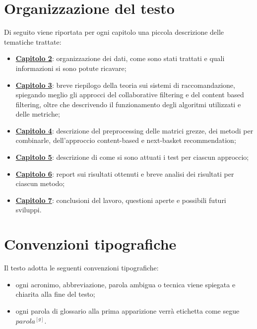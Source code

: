 \section{Organizzazione del testo}
Di seguito viene riportata per ogni capitolo una piccola descrizione delle tematiche trattate:
\begin{itemize}
	\item \hyperlink{(chap:capitolo3)}{\textbf{Capitolo 2}}: organizzazione dei dati, come sono stati trattati e quali informazioni si sono potute ricavare;
	\item \hyperlink{(chap:capitolo4)}{\textbf{Capitolo 3}}: breve riepilogo della teoria sui sistemi di raccomandazione, spiegando meglio gli approcci del collaborative filtering e del content based filtering, oltre che descrivendo il funzionamento degli algoritmi utilizzati e delle metriche;
	\item \hyperlink{(chap:capitolo5)}{\textbf{Capitolo 4}}: descrizione del preprocessing delle matrici grezze, dei metodi per combinarle, dell'approccio content-based e next-basket recommendation;
	\item \hyperlink{(chap:capitolo5)}{\textbf{Capitolo 5}}: descrizione di come si sono attuati i test per ciascun approccio;
	\item \hyperlink{(chap:capitolo6)}{\textbf{Capitolo 6}}: report sui risultati ottenuti e breve analisi dei risultati per ciascun metodo;
	\item \hyperlink{(chap:conclusioni)}{\textbf{Capitolo 7}}: conclusioni del lavoro, questioni aperte e possibili futuri sviluppi.
\end{itemize}
\section{Convenzioni tipografiche}
Il testo adotta le seguenti convenzioni tipografiche:
\begin{itemize}
	\item ogni acronimo, abbreviazione, parola ambigua o tecnica viene spiegata e chiarita alla fine del testo;
	\item ogni parola di glossario alla prima apparizione verrà etichetta come segue $parola^{[g]}$.
\end{itemize}